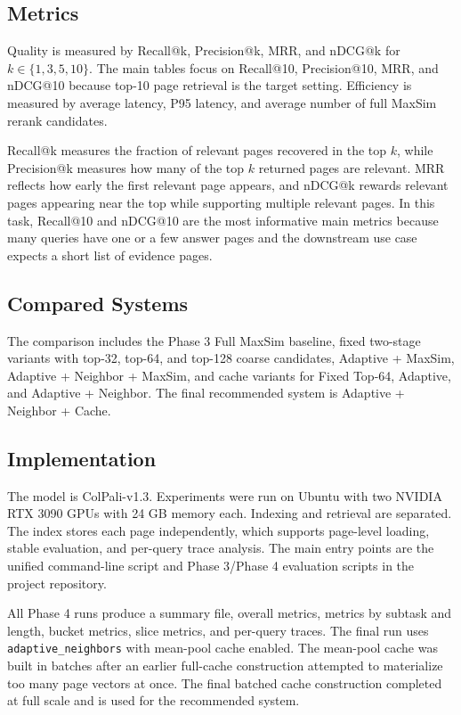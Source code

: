 \documentclass[11pt]{article}
\begin{document}
\subsection{Metrics}

Quality is measured by Recall@k, Precision@k, MRR, and nDCG@k for $k \in \{1,3,5,10\}$. The main tables focus on Recall@10, Precision@10, MRR, and nDCG@10 because top-10 page retrieval is the target setting. Efficiency is measured by average latency, P95 latency, and average number of full MaxSim rerank candidates.

Recall@k measures the fraction of relevant pages recovered in the top $k$, while Precision@k measures how many of the top $k$ returned pages are relevant. MRR reflects how early the first relevant page appears, and nDCG@k rewards relevant pages appearing near the top while supporting multiple relevant pages. In this task, Recall@10 and nDCG@10 are the most informative main metrics because many queries have one or a few answer pages and the downstream use case expects a short list of evidence pages.

\subsection{Compared Systems}

The comparison includes the Phase 3 Full MaxSim baseline, fixed two-stage variants with top-32, top-64, and top-128 coarse candidates, Adaptive + MaxSim, Adaptive + Neighbor + MaxSim, and cache variants for Fixed Top-64, Adaptive, and Adaptive + Neighbor. The final recommended system is Adaptive + Neighbor + Cache.

\subsection{Implementation}

The model is ColPali-v1.3. Experiments were run on Ubuntu with two NVIDIA RTX 3090 GPUs with 24 GB memory each. Indexing and retrieval are separated. The index stores each page independently, which supports page-level loading, stable evaluation, and per-query trace analysis. The main entry points are the unified command-line script and Phase 3/Phase 4 evaluation scripts in the project repository.

All Phase 4 runs produce a summary file, overall metrics, metrics by subtask and length, bucket metrics, slice metrics, and per-query traces. The final run uses \texttt{adaptive\_neighbors} with mean-pool cache enabled. The mean-pool cache was built in batches after an earlier full-cache construction attempted to materialize too many page vectors at once. The final batched cache construction completed at full scale and is used for the recommended system.
\end{document}
